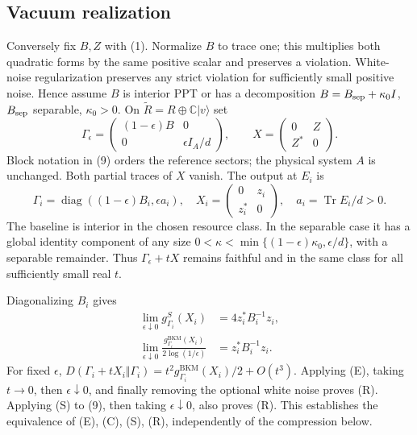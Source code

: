\documentclass[11pt]{article}
\newcommand{\Tr}{\operatorname{Tr}}
\newcommand{\C}{\mathbb C}
\begin{document}
\subsection{Vacuum realization}
Conversely fix $B,Z$ with (1). Normalize $B$ to trace one; this multiplies
both quadratic forms by the same positive scalar and preserves a violation.
White-noise regularization preserves any strict violation for sufficiently
small positive noise. Hence assume $B$ is interior PPT or has a decomposition
$B=B_{\rm sep}+\kappa_0 I$, $B_{\rm sep}$ separable, $\kappa_0>0$.
On $\widetilde R=R\oplus\C|v\rangle$ set
\[
 \Gamma_\epsilon=
   \begin{pmatrix}(1-\epsilon)B&0\\0&\epsilon I_A/d\end{pmatrix},
 \qquad
 X=\begin{pmatrix}0&Z\\Z^*&0\end{pmatrix}.                    \tag{9}
\]
Block notation in (9) orders the reference sectors; the physical system
$A$ is unchanged. Both partial traces of $X$ vanish. The output at $E_i$ is
\[
 \Gamma_i=\operatorname{diag}((1-\epsilon)B_i,\epsilon a_i),
 \quad X_i=\begin{pmatrix}0&z_i\\z_i^*&0\end{pmatrix},
 \quad a_i=\Tr E_i/d>0.                                      \tag{10}
\]
The baseline is interior in the chosen resource class. In the separable case
it has a global identity component of any size
$0<\kappa<\min\{(1-\epsilon)\kappa_0,\epsilon/d\}$, with a separable remainder.
Thus $\Gamma_\epsilon+tX$ remains faithful and in the same class for all
sufficiently small real $t$.

Diagonalizing $B_i$ gives
\begin{align}
 \lim_{\epsilon\downarrow0}g^S_{\Gamma_i}(X_i)&=4z_i^*B_i^{-1}z_i,
                                                                  \tag{11}\\
 \lim_{\epsilon\downarrow0}
   \frac{g^{\mathrm{BKM}}_{\Gamma_i}(X_i)}{2\log(1/\epsilon)}
                       &=z_i^*B_i^{-1}z_i.                       \tag{12}
\end{align}
For fixed $\epsilon$, $D(\Gamma_i+tX_i\Vert\Gamma_i)
=t^2 g^{\mathrm{BKM}}_{\Gamma_i}(X_i)/2+O(t^3)$.
Applying (E), taking $t\to0$, then $\epsilon\downarrow0$, and finally removing
the optional white noise proves (R). Applying (S) to (9), then taking
$\epsilon\downarrow0$, also proves (R). This establishes the equivalence of
(E), (C), (S), (R), independently of the compression below.
\end{document}
